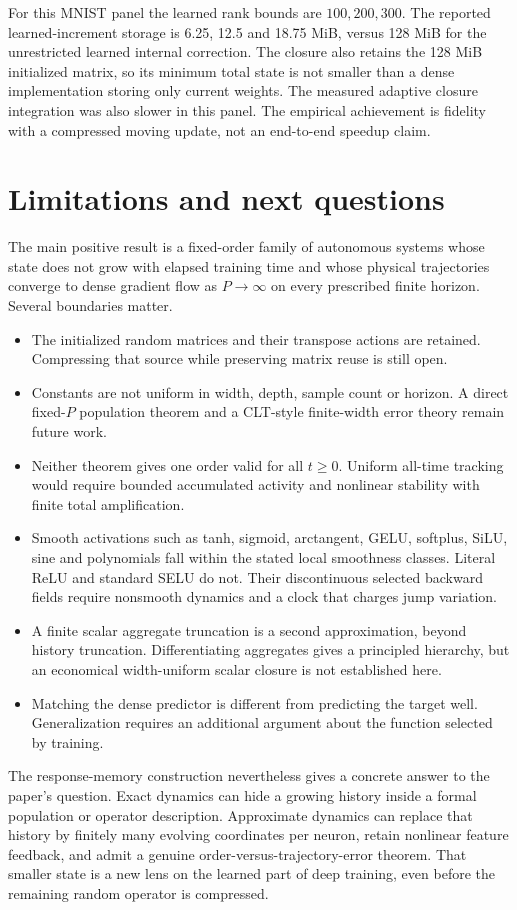 \documentclass[11pt]{article}
\theoremstyle{definition}
\theoremstyle{remark}
\begin{document}
For this MNIST panel the learned rank bounds are $100,200,300$.  The reported
learned-increment storage is 6.25, 12.5 and 18.75 MiB, versus 128 MiB for the
unrestricted learned internal correction.  The closure also retains the
128 MiB initialized matrix, so its minimum total state is not smaller than a
dense implementation storing only current weights.  The measured adaptive
closure integration was also slower in this panel.  The empirical achievement
is fidelity with a compressed moving update, not an end-to-end speedup claim.

\section{Limitations and next questions}

The main positive result is a fixed-order family of autonomous systems whose
state does not grow with elapsed training time and whose physical trajectories
converge to dense gradient flow as $P\to\infty$ on every prescribed finite
horizon.  Several boundaries matter.

\begin{itemize}
\item The initialized random matrices and their transpose actions are retained.
Compressing that source while preserving matrix reuse is still open.
\item Constants are not uniform in width, depth, sample count or horizon.  A
direct fixed-$P$ population theorem and a CLT-style finite-width error theory
remain future work.
\item Neither theorem gives one order valid for all $t\ge0$.  Uniform all-time
tracking would require bounded accumulated activity and nonlinear stability
with finite total amplification.
\item Smooth activations such as tanh, sigmoid, arctangent, GELU, softplus,
SiLU, sine and polynomials fall within the stated local smoothness classes.
Literal ReLU and standard SELU do not.  Their discontinuous selected backward
fields require nonsmooth dynamics and a clock that charges jump variation.
\item A finite scalar aggregate truncation is a second approximation, beyond
history truncation.  Differentiating aggregates gives a principled hierarchy,
but an economical width-uniform scalar closure is not established here.
\item Matching the dense predictor is different from predicting the target
well.  Generalization requires an additional argument about the function
selected by training.
\end{itemize}

The response-memory construction nevertheless gives a concrete answer to the
paper's question.  Exact dynamics can hide a growing history inside a formal
population or operator description.  Approximate dynamics can replace that
history by finitely many evolving coordinates per neuron, retain nonlinear
feature feedback, and admit a genuine order-versus-trajectory-error theorem.
That smaller state is a new lens on the learned part of deep training, even
before the remaining random operator is compressed.



\end{document}
